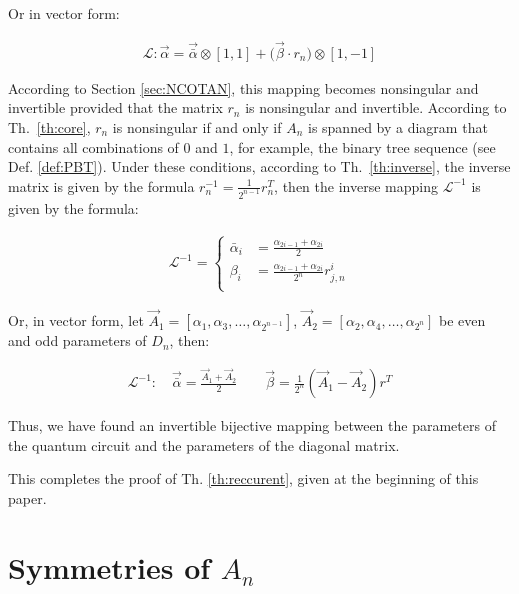 \documentclass[a4paper, openany, 12pt]{article}
\theoremstyle{remark}
\theoremstyle{definition}
\newcommand{\ot}{\otimes}
\begin{document}
Or in vector form:

\begin{align}
\mathcal{L}: \vec\alpha = \vec{\bar{\alpha}}\ot[1,1] + \big(\vec\beta \cdot r_n \big) \ot [1,-1]
\end{align}

According to Section \ref{sec:NCOTAN}, this mapping becomes nonsingular and invertible provided that the matrix $r_n$ is nonsingular and invertible. According to Th.~\ref{th:core}, $r_n$ is nonsingular if and only if $A_n$ is spanned by a diagram that contains all combinations of $0$ and $1$, for example, the binary tree sequence (see Def. \ref{def:PBT}). Under these conditions, according to Th.~\ref{th:inverse}, the inverse matrix is given by the formula $r_n^{-1} = \frac{1}{2^{n-1}}r^T_{n}$, then the inverse mapping $\mathcal{L}^{-1}$ is given by the formula:

\begin{align}
\mathcal{L}^{-1} =
\begin{cases}
\bar\alpha_i &= \frac{\alpha_{2i-1}+\alpha_{2i}}{2} \\
\beta_i &= \frac{\alpha_{2i-1}+\alpha_{2i}}{2^n}r^i_{j,n} \\
\end{cases}
\end{align}

Or, in vector form, let $\vec A_1 = [\alpha_1,\alpha_3,\dots,\alpha_{2^{n-1}}]$, $\vec A_2 = [\alpha_2, \alpha_4,\dots,\alpha_{2^{n}}]$ be even and odd parameters of $D_n$, then:

\begin{align}
\mathcal{L}^{-1}: \quad \vec{\bar{\alpha}} = \frac{\vec A_1+\vec A_2}{2} \qquad
\vec{\beta} = \frac{1}{2^n}(\vec A_1-\vec A_2)r^T
\end{align}




Thus, we have found an invertible bijective mapping between the parameters of the quantum circuit and the parameters of the diagonal matrix.



This completes the proof of Th. \ref{th:reccurent}, given at the beginning of this paper.

\section{Symmetries of $A_n$\label{sec:symmetries}}
\end{document}
